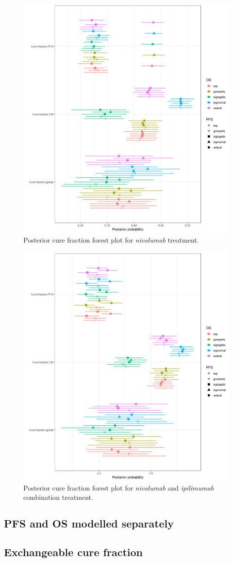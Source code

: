 \documentclass[AMA,STIX1COL]{WileyNJD-v2}
\begin{document}
\begin{figure}[H]
\centering
\includegraphics[width=0.6\linewidth]{forest_plot_NIVOLUMAB.png}
\caption{\label{fig:cf_forest_nivo} Posterior cure fraction forest plot for {\it nivolumab} treatment.}
\end{figure}

\begin{figure}[H]
\centering
\includegraphics[width=0.6\linewidth]{forest_plot_NIVOLUMAB+IPILIMUMAB.png}
\caption{\label{fig:cf_forest_ipi_nivo} Posterior cure fraction forest plot for {\it nivolumab} and {\it ipilimumab} combination treatment.}
\end{figure}


\subsection{PFS and OS modelled separately}
\subsection{Exchangeable cure fraction}
\end{document}
